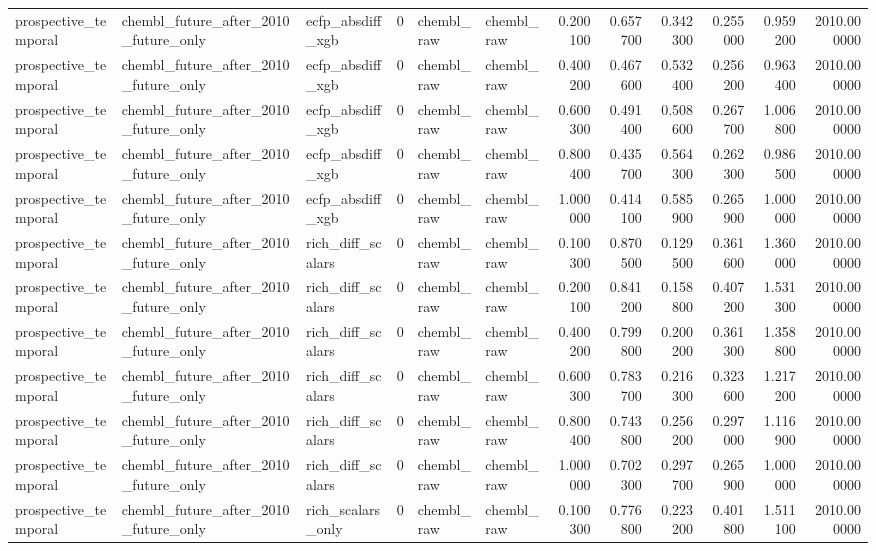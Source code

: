 \begin{longtable}{lllrllrrrrrr}
prospective\_temporal & chembl\_future\_after\_2010\_future\_only & ecfp\_absdiff\_xgb & 0 & chembl\_raw & chembl\_raw & 0.200100 & 0.657700 & 0.342300 & 0.255000 & 0.959200 & 2010.000000 \\
prospective\_temporal & chembl\_future\_after\_2010\_future\_only & ecfp\_absdiff\_xgb & 0 & chembl\_raw & chembl\_raw & 0.400200 & 0.467600 & 0.532400 & 0.256200 & 0.963400 & 2010.000000 \\
prospective\_temporal & chembl\_future\_after\_2010\_future\_only & ecfp\_absdiff\_xgb & 0 & chembl\_raw & chembl\_raw & 0.600300 & 0.491400 & 0.508600 & 0.267700 & 1.006800 & 2010.000000 \\
prospective\_temporal & chembl\_future\_after\_2010\_future\_only & ecfp\_absdiff\_xgb & 0 & chembl\_raw & chembl\_raw & 0.800400 & 0.435700 & 0.564300 & 0.262300 & 0.986500 & 2010.000000 \\
prospective\_temporal & chembl\_future\_after\_2010\_future\_only & ecfp\_absdiff\_xgb & 0 & chembl\_raw & chembl\_raw & 1.000000 & 0.414100 & 0.585900 & 0.265900 & 1.000000 & 2010.000000 \\
prospective\_temporal & chembl\_future\_after\_2010\_future\_only & rich\_diff\_scalars & 0 & chembl\_raw & chembl\_raw & 0.100300 & 0.870500 & 0.129500 & 0.361600 & 1.360000 & 2010.000000 \\
prospective\_temporal & chembl\_future\_after\_2010\_future\_only & rich\_diff\_scalars & 0 & chembl\_raw & chembl\_raw & 0.200100 & 0.841200 & 0.158800 & 0.407200 & 1.531300 & 2010.000000 \\
prospective\_temporal & chembl\_future\_after\_2010\_future\_only & rich\_diff\_scalars & 0 & chembl\_raw & chembl\_raw & 0.400200 & 0.799800 & 0.200200 & 0.361300 & 1.358800 & 2010.000000 \\
prospective\_temporal & chembl\_future\_after\_2010\_future\_only & rich\_diff\_scalars & 0 & chembl\_raw & chembl\_raw & 0.600300 & 0.783700 & 0.216300 & 0.323600 & 1.217200 & 2010.000000 \\
prospective\_temporal & chembl\_future\_after\_2010\_future\_only & rich\_diff\_scalars & 0 & chembl\_raw & chembl\_raw & 0.800400 & 0.743800 & 0.256200 & 0.297000 & 1.116900 & 2010.000000 \\
prospective\_temporal & chembl\_future\_after\_2010\_future\_only & rich\_diff\_scalars & 0 & chembl\_raw & chembl\_raw & 1.000000 & 0.702300 & 0.297700 & 0.265900 & 1.000000 & 2010.000000 \\
prospective\_temporal & chembl\_future\_after\_2010\_future\_only & rich\_scalars\_only & 0 & chembl\_raw & chembl\_raw & 0.100300 & 0.776800 & 0.223200 & 0.401800 & 1.511100 & 2010.000000 \\

\end{longtable}
